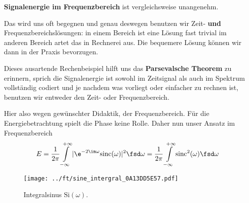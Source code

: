 \begin{Ansatz}
\textbf{Signalenergie im Frequenzbereich} ist vergleichsweise unangenehm.

Das wird uns oft begegnen und genau deswegen benutzen wir Zeit- \textbf{und}
Frequenzbereichslösungen:
in einem Bereich ist eine Lösung fast trivial im anderen Bereich artet das in
 Rechnerei aus.
%
Die bequemere Lösung können wir dann in der Praxis bevorzugen.
%

Dieses ausartende Rechenbeispiel hilft uns das \textbf{Parsevalsche Theorem}
zu erinnern, sprich die Signalenergie ist sowohl im Zeitsignal als auch im
Spektrum vollständig codiert und je nachdem was vorliegt oder einfacher
zu rechnen ist, benutzen wir entweder den Zeit- oder Frequenzbereich.

Hier also wegen gewünschter Didaktik, der Frequenzbereich. Für die Energiebetrachtung spielt die
Phase keine Rolle.
Daher nun unser Ansatz im Frequenzbereich
\begin{align}
\label{eq:0A13DD5E57_Energie_Freq_Ansatz}
E = \frac{1}{2\pi}\int\limits_{-\infty}^{+\infty} |\e^{-2 \im \omega} \mathrm{sinc}(\omega)|^2 \fsd \omega
=\frac{1}{2\pi}\int\limits_{-\infty}^{+\infty} \mathrm{sinc}^2(\omega) \fsd \omega
\end{align}

\end{Ansatz}

\begin{figure}
\centering
\texttt{[image: ../ft/sine\_intergral\_0A13DD5E57.pdf]}
\caption{Integralsinus $\mathrm{Si}(\omega)$.}
\label{fig:sine_intergral_0A13DD5E57}
\end{figure}


